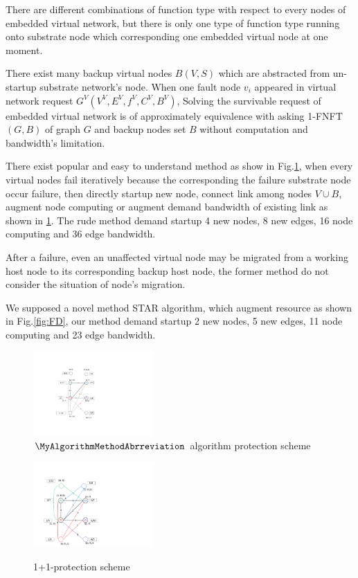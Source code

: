 There are different combinations of function type with respect to  every nodes of embedded virtual network, but there is only one type of function type running onto substrate node which corresponding one embedded virtual node at one moment.

There exist many backup virtual nodes $B(V,S)$ which are abstracted from un-startup substrate network's node. When one fault node $v_i$ appeared in virtual network request $G^V (V^V,E^V,f^V,C^V,B^V)$, Solving the survivable request of embedded virtual network is of approximately equivalence with asking 1-FNFT$(G,B)$ of graph $G$ and backup nodes set $B$ without computation and bandwidth's limitation.

There exist popular and easy to understand method\cite{yeow2011designing} as show in Fig.\ref{fig:FI}, when every virtual nodes fail iteratively because the corresponding the failure substrate node occur failure, then directly startup new node, connect link among nodes $V\cup B$, augment node computing or augment demand bandwidth of existing link as shown in \ref{fig:FI}. The rude method demand startup 4 new nodes, 8 new edges, 16 node computing and 36 edge bandwidth.

After a failure, even an unaffected virtual node may be migrated from a working host node to its corresponding backup host node, the former method\cite{yeow2011designing} do not consider the situation of node's migration.


We supposed a novel method STAR algorithm, which augment resource as shown in Fig.\ref{fig:FD}, our method demand startup 2 new nodes, 5 new edges, 11 node computing and 23 edge bandwidth.

\begin{figure}
\centering
\begin{minipage}[t]{0.4\linewidth}
\centering
\includegraphics[width=1.8in]{Fig/FD}\\
\caption{ $\MyAlgorithmMethodAbrreviation$ algorithm protection scheme}\label{fig:FD}
\end{minipage}
\hfill
\begin{minipage}[t]{0.4\linewidth}
\centering
\includegraphics[width=1.8in]{Fig/FI}\\
\caption{1+1-protection scheme}\label{fig:FI}
\end{minipage}
\end{figure}


